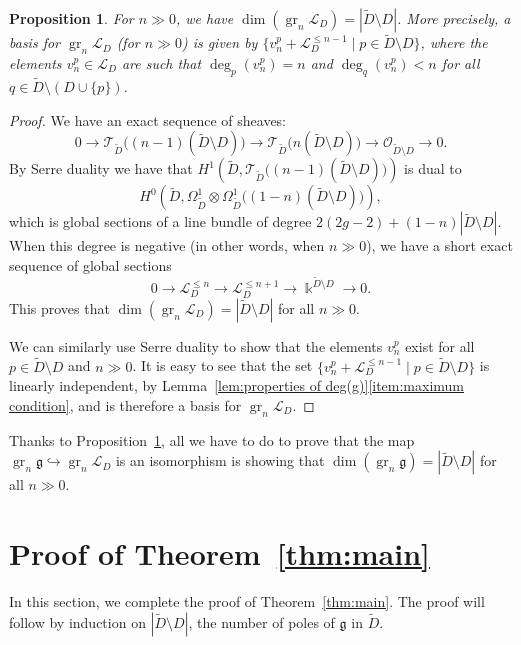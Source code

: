 \documentclass[12pt]{amsart}
\theoremstyle{plain}
\newtheorem{proposition}[theorem]{Proposition}
\theoremstyle{definition}
\numberwithin{equation}{section}
\def\g{\mathfrak{g}}
\def\L{\mathcal{L}}
\def\T{\mathcal{T}}
\def\O{\mathcal{O}}
\def\kk{\Bbbk}
\DeclareMathOperator{\gr}{gr}
\begin{document}
\begin{proposition}\label{prop:dimension of graded pieces}
    For $n \gg 0$, we have $\dim(\gr_n \L_D) = |\widetilde{D} \setminus D|$. More precisely, a basis for $\gr_n \L_D$ (for $n \gg 0$) is given by $\{v_n^p + \L_D^{\leq n - 1} \mid p \in \widetilde{D} \setminus D\}$, where the elements $v_n^p \in \L_D$ are such that $\deg_p(v_n^p) = n$ and $\deg_q(v_n^p) < n$ for all $q \in \widetilde{D} \setminus (D \cup \{p\})$.
\end{proposition}
\begin{proof}
    We have an exact sequence of sheaves:
    $$0 \to \T_{\widetilde{D}}\big((n - 1)(\widetilde{D} \setminus D)\big) \to \T_{\widetilde{D}}\big(n(\widetilde{D} \setminus D)\big) \to \O_{\widetilde{D}\setminus D} \to 0.$$
    By Serre duality we have that $H^1\left(\widetilde{D},\T_{\widetilde{D}}\big((n - 1)(\widetilde{D} \setminus D)\big)\right)$ is dual to $$H^0\left(\widetilde{D}, \Omega_{\widetilde{D}}^1 \otimes \Omega^1_{\widetilde{D}} \big((1 - n)(\widetilde{D} \setminus D)\big)\right),$$ which is global sections of a line bundle of degree $2(2g-2)+(1-n)|\widetilde{D}\setminus D|.$  When this degree is negative (in other words, when $n \gg 0$), we have a short exact sequence of global sections
    $$ 0 \to \L^{\leq n}_D \to \L^{\leq n+1}_D \to \kk^{\widetilde{D}\setminus D} \to 0.$$
    This proves that $\dim(\gr_n \L_D) = |\widetilde{D} \setminus D|$ for all $n \gg 0$.

    We can similarly use Serre duality to show that the elements $v_n^p$ exist for all $p \in \widetilde{D} \setminus D$ and $n \gg 0$. It is easy to see that the set $\{v_n^p + \L_D^{\leq n - 1} \mid p \in \widetilde{D} \setminus D\}$ is linearly independent, by Lemma~\ref{lem:properties of deg(g)}\eqref{item:maximum condition}, and is therefore a basis for $\gr_n \L_D$.
\end{proof}

Thanks to Proposition~\ref{prop:dimension of graded pieces}, all we have to do to prove that the map $\gr_n \g \hookrightarrow \gr_n \L_D$ is an isomorphism is showing that $\dim(\gr_n \g) = |\widetilde{D} \setminus D|$ for all $n \gg 0$.

\section{Proof of Theorem~\ref{thm:main}}\label{sec:proof of main theorem}

In this section, we complete the proof of Theorem~\ref{thm:main}. The proof will follow by induction on $|\widetilde{D} \setminus D|$, the number of poles of $\g$ in $\widetilde{D}$.
\end{document}
